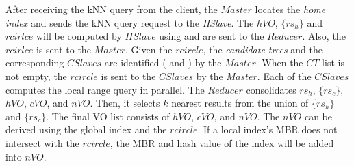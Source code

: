 After receiving the kNN query from the client, the $Master$ locates the \emph{home index} and sends the kNN query request to the \emph{HSlave}. The $hVO$, $\{rs_{h}\}$ and $rcirlce$ will be computed by $HSlave$ using  and are sent to the $Reducer$. Also, the $rcirlce$ is sent to the $Master$. Given the $rcircle$, the \emph{candidate trees} and the corresponding $CSlaves$ are identified ( and ) by the $Master$. When the $CT$ list is not empty, the $rcircle$ is sent to the $CSlaves$ by the $Master$. Each of the $CSlaves$ computes the local range query in parallel. The $Reducer$ consolidates $rs_{h}$, $\{rs_{c}\}$, $hVO$, $cVO$, and $nVO$. Then, it selects $k$ nearest results from the union of $\{rs_{h}\}$ and $\{rs_{c}\}$. The final VO list consists of $hVO$, $cVO$, and $nVO$. The $nVO$ can be derived using the global index and the $rcircle$. If a local index's MBR does not intersect with the $rcircle$, the MBR and hash value of the index will be added into $nVO$.

